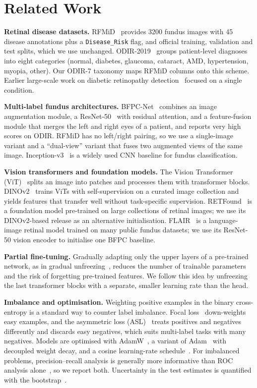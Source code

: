 ﻿\documentclass[conference]{IEEEtran}
\begin{document}
\section{Related Work}
\textbf{Retinal disease datasets.}
RFMiD~\cite{pachade2021rfmid} provides 3200 fundus images with 45 disease annotations plus a \texttt{Disease\_Risk} flag, and official training, validation and test splits, which we use unchanged.
ODIR-2019~\cite{odir2019} groups patient-level diagnoses into eight categories (normal, diabetes, glaucoma, cataract, AMD, hypertension, myopia, other). Our ODIR-7 taxonomy maps RFMiD columns onto this scheme.
Earlier large-scale work on diabetic retinopathy detection~\cite{gulshan2016dr} focused on a single condition.

\textbf{Multi-label fundus architectures.}
BFPC-Net~\cite{li2022bfpc} combines an image augmentation module, a ResNet-50~\cite{he2016resnet} with residual attention, and a feature-fusion module that merges the left and right eyes of a patient, and reports very high scores on ODIR.
RFMiD has no left/right pairing, so we use a single-image variant and a ``dual-view'' variant that fuses two augmented views of the same image.
Inception-v3~\cite{szegedy2016inception} is a widely used CNN baseline for fundus classification.

\textbf{Vision transformers and foundation models.}
The Vision Transformer (ViT)~\cite{dosovitskiy2021vit} splits an image into patches and processes them with transformer blocks.
DINOv2~\cite{oquab2024dinov2} trains ViTs with self-supervision on a curated image collection and yields features that transfer well without task-specific supervision.
RETFound~\cite{zhou2023retfound} is a foundation model pre-trained on large collections of retinal images; we use its DINOv2-based release as an alternative initialisation.
FLAIR~\cite{silva2025flair} is a language-image retinal model trained on many public fundus datasets; we use its ResNet-50 vision encoder to initialise one BFPC baseline.

\textbf{Partial fine-tuning.}
Gradually adapting only the upper layers of a pre-trained network, as in gradual unfreezing~\cite{howard2018ulmfit}, reduces the number of trainable parameters and the risk of forgetting pre-trained features.
We follow this idea by unfreezing the last transformer blocks with a separate, smaller learning rate than the head.

\textbf{Imbalance and optimisation.}
Weighting positive examples in the binary cross-entropy is a standard way to counter label imbalance. Focal loss~\cite{lin2017focal} down-weights easy examples, and the asymmetric loss (ASL)~\cite{ridnik2021asl} treats positives and negatives differently and discards easy negatives, which suits multi-label tasks with many negatives.
Models are optimised with AdamW~\cite{loshchilov2019adamw}, a variant of Adam~\cite{kingma2015adam} with decoupled weight decay, and a cosine learning-rate schedule~\cite{loshchilov2017sgdr}.
For imbalanced problems, precision--recall analysis is generally more informative than ROC analysis alone~\cite{saito2015prroc}, so we report both.
Uncertainty in the test estimates is quantified with the bootstrap~\cite{efron1993bootstrap}.
\end{document}
